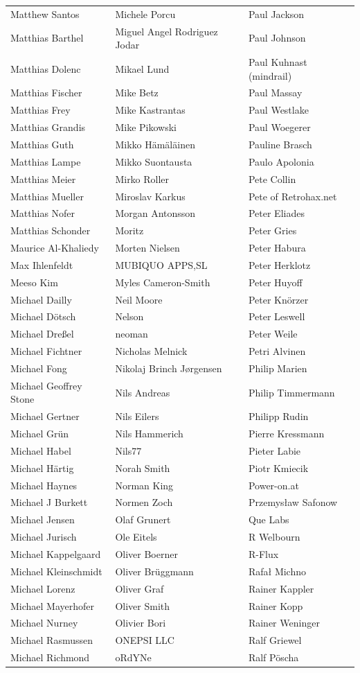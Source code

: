 \begin{small}
\begin{tabular}{p{4cm}p{4cm}p{4cm}}
Matthew Santos & Michele Porcu & Paul Jackson \\Matthias Barthel & Miguel Angel Rodriguez Jodar & Paul Johnson \\Matthias Dolenc & Mikael Lund & Paul Kuhnast (mindrail) \\Matthias Fischer & Mike Betz & Paul Massay \\Matthias Frey & Mike Kastrantas & Paul Westlake \\Matthias Grandis & Mike Pikowski & Paul Woegerer \\Matthias Guth & Mikko Hämäläinen & Pauline Brasch \\Matthias Lampe & Mikko Suontausta & Paulo Apolonia \\Matthias Meier & Mirko Roller & Pete Collin \\Matthias Mueller & Miroslav Karkus & Pete of Retrohax.net \\Matthias Nofer & Morgan Antonsson & Peter Eliades \\Matthias Schonder & Moritz & Peter Gries \\Maurice Al-Khaliedy & Morten Nielsen & Peter Habura \\Max Ihlenfeldt & MUBIQUO APPS,SL & Peter Herklotz \\Meeso Kim & Myles Cameron-Smith & Peter Huyoff \\Michael Dailly & Neil Moore & Peter Knörzer \\Michael Dötsch & Nelson & Peter Leswell \\Michael Dreßel & neoman & Peter Weile \\Michael Fichtner & Nicholas Melnick & Petri Alvinen \\Michael Fong & Nikolaj Brinch Jørgensen & Philip Marien \\Michael Geoffrey Stone & Nils Andreas & Philip Timmermann \\Michael Gertner & Nils Eilers & Philipp Rudin \\Michael Grün & Nils Hammerich & Pierre Kressmann \\Michael Habel & Nils77 & Pieter Labie \\Michael Härtig & Norah Smith & Piotr Kmiecik \\Michael Haynes & Norman King & Power-on.at \\Michael J Burkett & Normen Zoch & Przemysław Safonow \\Michael Jensen & Olaf Grunert & Que Labs \\Michael Jurisch & Ole Eitels & R Welbourn \\Michael Kappelgaard & Oliver Boerner & R-Flux \\Michael Kleinschmidt & Oliver Brüggmann & Rafał Michno \\Michael Lorenz & Oliver Graf & Rainer Kappler \\Michael Mayerhofer & Oliver Smith & Rainer Kopp \\Michael Nurney & Olivier Bori & Rainer Weninger \\Michael Rasmussen & ONEPSI LLC & Ralf Griewel \\Michael Richmond & oRdYNe & Ralf Pöscha 
\end{tabular}
\end{small}
